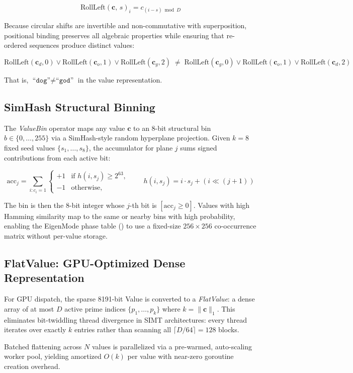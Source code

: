 \begin{equation}
  \text{RollLeft}(\mathbf{c},\, s)_i = c_{(i - s) \bmod D}
  \label{eq:roll_left}
\end{equation}

Because circular shifts are invertible and non-commutative with
superposition, positional binding preserves all algebraic properties while
ensuring that re-ordered sequences produce distinct values:

\begin{equation}
  \text{RollLeft}(\mathbf{c}_d, 0) \lor \text{RollLeft}(\mathbf{c}_o, 1)
  \lor \text{RollLeft}(\mathbf{c}_g, 2)
  \;\neq\;
  \text{RollLeft}(\mathbf{c}_g, 0) \lor \text{RollLeft}(\mathbf{c}_o, 1)
  \lor \text{RollLeft}(\mathbf{c}_d, 2)
  \label{eq:dog_god}
\end{equation}

\noindent That is, $\texttt{``dog''} \neq \texttt{``god''}$ in the value
representation.

\subsection{SimHash Structural Binning}
\label{sec:value_bin}

The \emph{ValueBin} operator maps any value $\mathbf{c}$ to an 8-bit
structural bin $b \in \{0, \ldots, 255\}$ via a SimHash-style random
hyperplane projection.  Given $k = 8$ fixed seed values
$\{s_1, \ldots, s_8\}$, the accumulator for plane $j$ sums signed
contributions from each active bit:

\begin{equation}
  \text{acc}_j = \sum_{i : c_i = 1}
  \begin{cases}
    +1 & \text{if } h(i, s_j) \geq 2^{63}, \\
    -1 & \text{otherwise,}
  \end{cases}
  \qquad
  h(i, s_j) = i \cdot s_j + (i \ll (j+1))
  \label{eq:simhash}
\end{equation}

The bin is then the 8-bit integer whose $j$-th bit is $[\text{acc}_j \geq 0]$.
Values with high Hamming similarity map to the same or nearby bins with
high probability, enabling the EigenMode phase table
() to use a fixed-size $256 \times 256$
co-occurrence matrix without per-value storage.

\subsection{FlatValue: GPU-Optimized Dense Representation}
\label{sec:flat_value}

For GPU dispatch, the sparse 8191-bit Value is converted to a \emph{FlatValue}:
a dense array of at most $D$ active prime indices $\{p_1, \ldots, p_k\}$
where $k = \|\mathbf{c}\|_1$.  This eliminates bit-twiddling thread
divergence in SIMT architectures: every thread iterates over exactly
$k$ entries rather than scanning all $\lceil D/64 \rceil = 128$ blocks.

Batched flattening across $N$ values is parallelized via a pre-warmed,
auto-scaling worker pool, yielding amortized $O(k)$ per value with
near-zero goroutine creation overhead.
